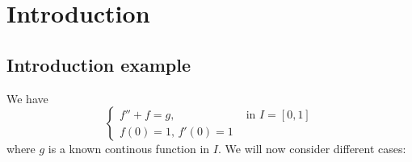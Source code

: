 
\newcommand{\Semester}{WiSe 2016/2017, Term 1}
\newcommand{\fach}{Applied Functionalanalysis}
\newcommand{\prof}{Prof.\ Peter Kumlin}






\maketitle
\cleardoubleoddemptypage
%
%

\newpage

\tableofcontents
\cleardoubleoddemptypage
{}
\setcounter{page}{1}

\section{Introduction}
\subsection{Introduction example} 
\label{sub:introduction_example}
We have
\[
	\begin{cases}
		f''+f =g, &\text{ in }I = [0,1]\\
		f(0)=1, \,f'(0)=1
	\end{cases}
\]
where $g$ is a known continous function in $I$. We will now consider different cases:

